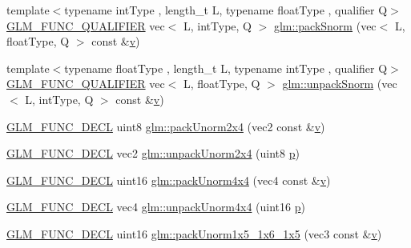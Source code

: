 \begin{DoxyCompactItemize}
\item 
{\footnotesize template$<$typename int\+Type , length\+\_\+t L, typename float\+Type , qualifier Q$>$ }\\\mbox{\hyperlink{setup_8hpp_a33fdea6f91c5f834105f7415e2a64407}{G\+L\+M\+\_\+\+F\+U\+N\+C\+\_\+\+Q\+U\+A\+L\+I\+F\+I\+ER}} vec$<$ L, int\+Type, Q $>$ \mbox{\hyperlink{group__gtc__packing_gaa54b5855a750d6aeb12c1c902f5939b8}{glm\+::pack\+Snorm}} (vec$<$ L, float\+Type, Q $>$ const \&\mbox{\hyperlink{_s_d_l__opengl_8h_a10a82eabcb59d2fcd74acee063775f90}{v}})
\item 
{\footnotesize template$<$typename float\+Type , length\+\_\+t L, typename int\+Type , qualifier Q$>$ }\\\mbox{\hyperlink{setup_8hpp_a33fdea6f91c5f834105f7415e2a64407}{G\+L\+M\+\_\+\+F\+U\+N\+C\+\_\+\+Q\+U\+A\+L\+I\+F\+I\+ER}} vec$<$ L, float\+Type, Q $>$ \mbox{\hyperlink{group__gtc__packing_ga6d49b31e5c3f9df8e1f99ab62b999482}{glm\+::unpack\+Snorm}} (vec$<$ L, int\+Type, Q $>$ const \&\mbox{\hyperlink{_s_d_l__opengl_8h_a10a82eabcb59d2fcd74acee063775f90}{v}})
\item 
\mbox{\hyperlink{setup_8hpp_ab2d052de21a70539923e9bcbf6e83a51}{G\+L\+M\+\_\+\+F\+U\+N\+C\+\_\+\+D\+E\+CL}} uint8 \mbox{\hyperlink{group__gtc__packing_gad68eb2f848ba867192b8787998c0595a}{glm\+::pack\+Unorm2x4}} (vec2 const \&\mbox{\hyperlink{_s_d_l__opengl_8h_a10a82eabcb59d2fcd74acee063775f90}{v}})
\item 
\mbox{\hyperlink{setup_8hpp_ab2d052de21a70539923e9bcbf6e83a51}{G\+L\+M\+\_\+\+F\+U\+N\+C\+\_\+\+D\+E\+CL}} vec2 \mbox{\hyperlink{group__gtc__packing_ga3afb0452954320f2d83fe6f38cb24147}{glm\+::unpack\+Unorm2x4}} (uint8 \mbox{\hyperlink{_s_d_l__opengl__glext_8h_aa5367c14d90f462230c2611b81b41d23}{p}})
\item 
\mbox{\hyperlink{setup_8hpp_ab2d052de21a70539923e9bcbf6e83a51}{G\+L\+M\+\_\+\+F\+U\+N\+C\+\_\+\+D\+E\+CL}} uint16 \mbox{\hyperlink{group__gtc__packing_gad493c9f130e91dd8a4b360b05dcea573}{glm\+::pack\+Unorm4x4}} (vec4 const \&\mbox{\hyperlink{_s_d_l__opengl_8h_a10a82eabcb59d2fcd74acee063775f90}{v}})
\item 
\mbox{\hyperlink{setup_8hpp_ab2d052de21a70539923e9bcbf6e83a51}{G\+L\+M\+\_\+\+F\+U\+N\+C\+\_\+\+D\+E\+CL}} vec4 \mbox{\hyperlink{group__gtc__packing_ga38a0a518d53e15a9481c31dc1e574a40}{glm\+::unpack\+Unorm4x4}} (uint16 \mbox{\hyperlink{_s_d_l__opengl__glext_8h_aa5367c14d90f462230c2611b81b41d23}{p}})
\item 
\mbox{\hyperlink{setup_8hpp_ab2d052de21a70539923e9bcbf6e83a51}{G\+L\+M\+\_\+\+F\+U\+N\+C\+\_\+\+D\+E\+CL}} uint16 \mbox{\hyperlink{group__gtc__packing_ga0fcb493167d540aca105d11df5c55503}{glm\+::pack\+Unorm1x5\+\_\+1x6\+\_\+1x5}} (vec3 const \&\mbox{\hyperlink{_s_d_l__opengl_8h_a10a82eabcb59d2fcd74acee063775f90}{v}})

\end{DoxyCompactItemize}
